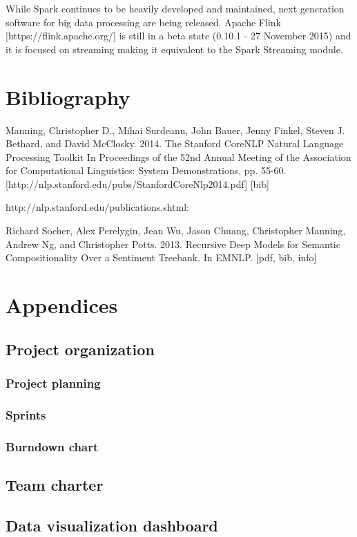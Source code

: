 \documentclass[11pt]{article}
\begin{document}
While Spark continues to be heavily developed and maintained, next generation software for big data processing are being released. Apache Flink [https://flink.apache.org/] is still in a beta state (0.10.1 - 27 November 2015) and it is focused on streaming making it equivalent to the Spark Streaming module.

\section{Bibliography}




Manning, Christopher D., Mihai Surdeanu, John Bauer, Jenny Finkel, Steven J. Bethard, and David McClosky. 2014. The Stanford CoreNLP Natural Language Processing Toolkit In Proceedings of the 52nd Annual Meeting of the Association for Computational Linguistics: System Demonstrations, pp. 55-60. [http://nlp.stanford.edu/pubs/StanfordCoreNlp2014.pdf] [bib]

http://nlp.stanford.edu/publications.shtml:

Richard Socher, Alex Perelygin, Jean Wu, Jason Chuang, Christopher Manning, Andrew Ng, and Christopher Potts. 2013. Recursive Deep Models for Semantic Compositionality Over a Sentiment Treebank. In EMNLP. [pdf, bib, info]


\newpage
{}
\section{Appendices}
\subsection{Project organization}

\subsubsection{Project planning}

\subsubsection{Sprints}



\subsubsection{Burndown chart}


\subsection{Team charter}

\subsection{Data visualization dashboard}
\end{document}
